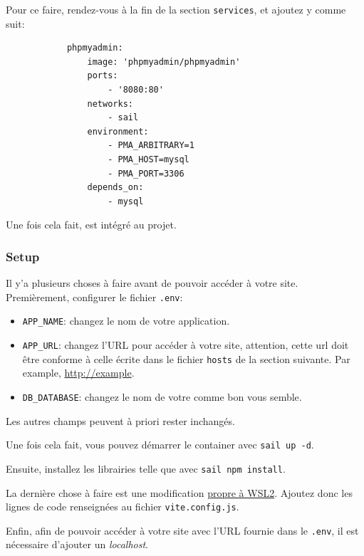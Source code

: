         Pour ce faire, rendez-vous à la fin de la section \verb|services|, et ajoutez y \phpmyadmin{} comme suit:

        \begin{lstlisting}
            phpmyadmin:
                image: 'phpmyadmin/phpmyadmin'
                ports:
                    - '8080:80'
                networks:
                    - sail
                environment:
                    - PMA_ARBITRARY=1
                    - PMA_HOST=mysql
                    - PMA_PORT=3306
                depends_on:
                    - mysql
        \end{lstlisting}

        Une fois cela fait, \phpmyadmin{} est intégré au projet.

        \subsubsection[Setup]{Setup}
        Il y'a plusieurs choses à faire avant de pouvoir accéder à votre site. Premièrement, configurer le fichier \verb|.env|:

        \begin{itemize}
            \item \verb|APP_NAME|: changez le nom de votre application.
            \item \verb|APP_URL|: changez l'URL pour accéder à votre site, attention, cette url doit être conforme à celle écrite dans le fichier \verb|hosts| de la section suivante. Par example, \url{http://example}.
            \item \verb|DB_DATABASE|: changez le nom de votre \db{} comme bon vous semble.
        \end{itemize}
        Les autres champs peuvent à priori rester inchangés.

        Une fois cela fait, vous pouvez démarrer le container avec \verb|sail up -d|.

        Ensuite, installez les librairies \js{} telle que \vite{} avec \verb|sail npm install|.

        La dernière chose à faire est une modification \href{https://laravel.com/docs/10.x/vite#configuring-hmr-in-sail-on-wsl2}{propre à WSL2}. Ajoutez donc les lignes de code renseignées au fichier \verb|vite.config.js|.

        Enfin, afin de pouvoir accéder à votre site avec l'URL fournie dans le \verb|.env|, il est nécessaire d'ajouter un \textit{localhost}.

